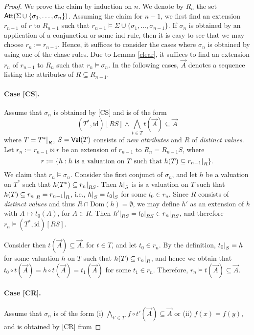 \documentclass[envcountset]{llncs}
\newcommand{\problemFont}[1]{\protect\ensuremath{\mathsf{#1}}}
\newcommand{\si}{\sigma}
\newcommand{\Si}{\Sigma}
\newcommand{\sub}{\subseteq}
\newcommand{\tuple}[1]{\vec{#1}}
\newcommand{\Dom}{\textrm{Dom}}
\newcommand{\ja}{\wedge}
\newcommand{\bo}{\bowtie}
\newcommand{\at}{\problemFont{Att}}
\newcommand\re[2]{{\left.\kern-\nulldelimiterspace #1 \vphantom{|} \right|_{#2} }}
\newcommand{\Val}{\problemFont{Val}}
\newcommand{\id}{\mathrm{id}}
\begin{document}
\begin{proof}
We prove the claim by induction on $n$. We denote by $R_n$ the set $\at(\Si\cup\{\si_1, \ldots ,\si_n\})$. Assuming the claim for $n-1$, we first find an extension $r_{n-1}$ of $r$ to $R_{n-1}$ such that $r_{n-1}\models \Si\cup\{\si_1, \ldots ,\si_{n-1}\}$. If $\si_n$ is obtained by an application of a conjunction or some ind rule, then it is easy to see that we may choose $r_n:=r_{n-1}$. Hence, it suffices to consider the cases where $\si_n$ is obtained by using one of the chase rules. Due to Lemma \ref{clear}, it suffices to find an extension $r_n$ of $r_{n-1}$ to $R_n$ such that $r_n\models \si_n$. In the following cases, $\tuple A$ denotes a sequence listing the attributes of $R\sub R_{n-1}$.


\paragraph{\textbf{Case [CS].}} Assume that $\si_n$ is obtained by [CS] and is of the form $$(T^*,\id)[RS]\ja \bigwedge_{t\in T}  t(\tuple A) \sub  \tuple A$$
where $T=\re{T^*}{R}$, $S=\Val(T)$ consists of \emph{new attributes} and $R$ of \emph{distinct values}. Let $r_n:= r_{n-1}\bo r$ be an extension of $r_{n-1} $ to $R_n=R_{n-1} S$, where 
$$r:= \{ h: h\textrm{ is a valuation on }T \textrm{ such that } h(T) \sub \re{r_{n-1}}{R}\}.$$ We claim that $r_n\models \si_{n}$. Consider the first conjunct of $\si_n$, and let $h$ be a valuation on $T^*$ such that $h(T^*) \sub \re{r_n}{RS}$. Then $\re{h}{S}$ is is a valuation on $T$ such that $h(T) \sub \re{r_{n}}{R}=\re{r_{n-1}}{R}$, i.e., $\re{h}{S}=\re{t_0}{S}$ for some $t_0\in r_n$. Since $R$ consists of \emph{distinct values} and thus $R\cap \Dom(h) =\emptyset$, we may define $h'$ as an extension of $h$ with $A\mapsto t_0(A)$, for $A\in R$. Then $\re{h'}{RS}=\re{t_0}{RS}\in \re{r_n}{RS}$, and therefore $r_n \models (T^*,\id)[RS]$.


Consider then $ t(\tuple A) \sub  \tuple A$, for $t\in T$, and let $t_0\in r_n$.
By the definition, $\re{t_0}{S}=  h$ for some valuation $h$ on $T$ such that   $h(T) \sub \re{r_{n}}{R}$, and hence we obtain that $t_0\circ t(\tuple A)=h\circ t(\tuple A)= t_1(\tuple A)$ for some $t_1\in r_n$. Therefore, $r_n\models  t(\tuple A) \sub  \tuple A$.



\paragraph{\textbf{Case [CR].}} Assume that $\si_n$ is of the form (i) $\bigwedge_{t'\in T'}f\circ t'(\tuple A) \sub \tuple A$ or (ii) $f(x)=f(y)$, and is obtained by [CR] from 


\end{proof}
\end{document}
